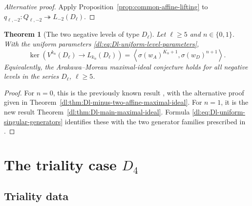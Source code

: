 \documentclass[11pt,reqno]{amsart}
\newtheorem{theorem}{Theorem}[section]
\theoremstyle{definition}
\theoremstyle{remark}
\begin{document}
\begin{proof}[Alternative proof]
Apply Proposition~\ref{prop:common-affine-lifting} to
$q_{\ell,-2}:Q_{\ell,-2}\twoheadrightarrow L_{-2}(D_\ell)$.
\end{proof}

\begin{theorem}[The two negative levels of type \(D_\ell\)]

Let \(\ell\ge5\) and \(n\in\{0,1\}\).  With the uniform parameters
\eqref{dl:eq:Dl-uniform-level-parameters},
\begin{equation*}
 \ker\!\left(
   V^{k_n}(D_\ell)\longrightarrow L_{k_n}(D_\ell)
 \right)
 =
 \left\langle
   \sigma(w_A)^{K_n+1},
   \sigma(w_D)^{n+1}
 \right\rangle.
\end{equation*}
Equivalently, the Arakawa--Moreau maximal-ideal conjecture holds for
all negative levels in the series \(D_\ell\), \(\ell\ge5\).
\end{theorem}

\begin{proof}
	For $n=0$, this is the previously known result
	\cite[Corollary~6.6(1)]
	{AdamovicKacMosenederFrajriaPapiPerse2020}, with the alternative proof
	given in Theorem~\ref{dl:thm:Dl-minus-two-affine-maximal-ideal}.
	For $n=1$, it is the new result
	Theorem~\ref{dl:thm:Dl-main-maximal-ideal}.  Formula
	\eqref{dl:eq:Dl-uniform-singular-generators} identifies these with the two
	generator families prescribed in
	\cite[Sections~4--5]{ArakawaMoreau2018}.
\end{proof}
\section{The triality case \texorpdfstring{$D_4$}{D4}}
\label{sec:case-d4}


\subsection{Triality data}
\label{d4:sec:D4-preliminaries}
\end{document}
